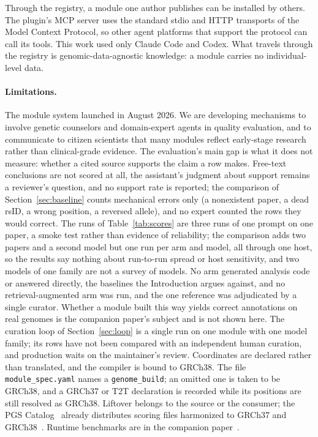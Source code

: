 \documentclass[11pt,a4paper]{article}
\begin{document}
Through the registry, a module one author publishes can be installed by
others. The plugin's MCP server uses the standard stdio and HTTP transports of the
Model Context Protocol, so other agent platforms that support the protocol can
call its tools. This work used only Claude Code and Codex. What travels through the registry is genomic-data-agnostic knowledge:
a module carries no individual-level data.

\paragraph{Limitations.}
The module system launched in August 2026. We are developing mechanisms to involve genetic counselors and
domain-expert agents in quality evaluation, and to communicate to citizen
scientists that many modules reflect early-stage research rather than
clinical-grade evidence. The evaluation's main gap is what it does not
measure: whether a cited source supports the claim a row makes. Free-text
conclusions are not scored at all, the assistant's judgment about support
remains a reviewer's question, and no support rate is reported; the comparison of
Section~\ref{sec:baseline} counts mechanical errors only (a nonexistent paper,
a dead rsID, a wrong position, a reversed allele), and no expert counted the
rows they would correct. The runs of Table~\ref{tab:scores} are three runs of
one prompt on one paper, a smoke test rather than evidence of reliability; the
comparison adds two papers and a second model but one run per arm and model,
all through one host, so the results say nothing about run-to-run spread or
host sensitivity, and two models of one family are not a survey of models. No arm generated analysis code or answered directly, the baselines the
Introduction argues against, and no retrieval-augmented arm was run, and the one reference
was adjudicated by a single curator.
Whether a module built this way yields correct annotations on real genomes is
the companion paper's subject and is not shown here.
The curation loop of Section~\ref{sec:loop} is a single run on one module with
one model family; its rows have not been compared with an independent human
curation, and production waits on the maintainer's review. Coordinates
are declared rather than translated, and the compiler is bound to GRCh38.
The file \texttt{module\_spec.yaml} names a \texttt{genome\_build}; an omitted one is
taken to be GRCh38, and a GRCh37 or T2T declaration is recorded while its
positions are still resolved as GRCh38. Liftover belongs
to the source or the consumer; the PGS Catalog~\citep{lambert2021pgs} already
distributes scoring files harmonized to GRCh37 and GRCh38~\citep{pgscatalogdownloads}. Runtime benchmarks are in the companion
paper~\citep{companion2026justdnalite}.
\end{document}
